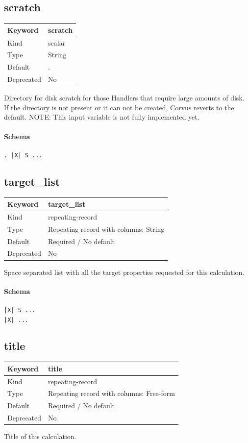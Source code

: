 \documentclass[11pt]{article}
\begin{document}
\subsection{scratch}
\label{kw:scratch}
\begin{longtable}{|p{1.5in}|p{4.5in}|}
\hline
Keyword & scratch \\
\hline
Kind & scalar \\
\hline
Type & String \\
\hline
Default & . \\
\hline
Deprecated & No \\
\hline
\end{longtable}
 Directory for disk scratch for those Handlers that require large amounts of
 disk. If the directory is not present or it can not be created, Corvus reverts
 to the default.
 NOTE: This input variable is not fully implemented yet.

\paragraph{Schema}
\begin{Verbatim}
. |X| S ...
\end{Verbatim}

\subsection{target\_list}
\label{kw:target-list}
\begin{longtable}{|p{1.5in}|p{4.5in}|}
\hline
Keyword & target\_list \\
\hline
Kind & repeating-record \\
\hline
Type & Repeating record with columns: String \\
\hline
Default & Required / No default \\
\hline
Deprecated & No \\
\hline
\end{longtable}
 Space separated list with all the target properties requested for this calculation.


\paragraph{Schema}
\begin{Verbatim}
|X| S ...
|X| ...
\end{Verbatim}

\subsection{title}
\label{kw:title}
\begin{longtable}{|p{1.5in}|p{4.5in}|}
\hline
Keyword & title \\
\hline
Kind & repeating-record \\
\hline
Type & Repeating record with columns: Free-form \\
\hline
Default & Required / No default \\
\hline
Deprecated & No \\
\hline
\end{longtable}
 Title of this calculation.
\end{document}
